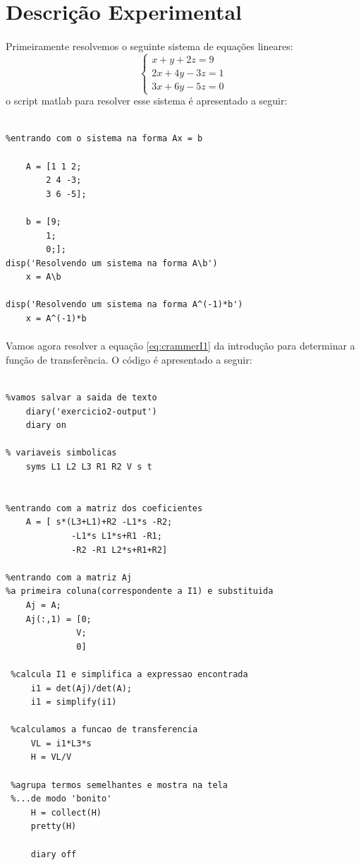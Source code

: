 \documentclass[a4paper,11pt]{article}
\begin{document}
\newpage
\section{Descrição Experimental}
\paragraph{}Primeiramente resolvemos o seguinte sistema
de equações lineares:
\begin{displaymath}
  \left\{
       \begin{array}{l}
          x + y + 2z = 9 \\
          2x + 4y - 3z = 1 \\
          3x + 6y - 5z = 0        
      \end{array}
  \right.
\end{displaymath}
o script matlab para resolver esse sistema é apresentado a seguir:

\begin{lstlisting}[frame=single]

%entrando com o sistema na forma Ax = b

    A = [1 1 2;
        2 4 -3;
        3 6 -5];

    b = [9;
        1;
        0;];
disp('Resolvendo um sistema na forma A\b')
    x = A\b

disp('Resolvendo um sistema na forma A^(-1)*b')
    x = A^(-1)*b
\end{lstlisting}

\paragraph{}Vamos agora resolver a equação \ref{eq:crammerI1}
da introdução para determinar a função de transferência. O código
é apresentado a seguir:

\newpage

\begin{lstlisting}[frame=single]

%vamos salvar a saida de texto
    diary('exercicio2-output')
    diary on

% variaveis simbolicas
    syms L1 L2 L3 R1 R2 V s t


%entrando com a matriz dos coeficientes
    A = [ s*(L3+L1)+R2 -L1*s -R2; 
             -L1*s L1*s+R1 -R1;
             -R2 -R1 L2*s+R1+R2]

%entrando com a matriz Aj
%a primeira coluna(correspondente a I1) e substituida
    Aj = A;
    Aj(:,1) = [0;
              V;
              0]

 %calcula I1 e simplifica a expressao encontrada
     i1 = det(Aj)/det(A);
     i1 = simplify(i1)

 %calculamos a funcao de transferencia
     VL = i1*L3*s
     H = VL/V

 %agrupa termos semelhantes e mostra na tela
 %...de modo 'bonito'
     H = collect(H)
     pretty(H)
    
     diary off
\end{lstlisting}
\end{document}
